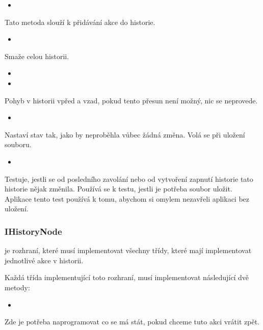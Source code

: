 \documentclass[
  field=inf,
  biblatex=false,
  glossaries,
  index
]{kidiplom}
\begin{document}
\begin{itemize}
\item {}
\end{itemize}
Tato metoda slouží k přidávání akce do historie.

\begin{itemize}
\item {}
\end{itemize}
Smaže celou historii.

\begin{itemize}
\item {}
\item {}
\end{itemize}
Pohyb v historii vpřed a vzad, pokud tento přesun není možný, nic se neprovede.

\begin{itemize}
\item {}
\end{itemize}
Nastaví stav tak, jako by neproběhla vůbec žádná změna. Volá se při uložení souboru.

\begin{itemize}
\item {}
\end{itemize}
Testuje, jestli se od posledního zavolání  nebo od vytvoření zapnutí historie tato historie nějak změnila. Používá se k testu, jestli je potřeba soubor uložit. Aplikace tento test používá k tomu, abychom si omylem nezavřeli aplikaci bez uložení.

\subsubsection{IHistoryNode}
 je rozhraní, které musí implementovat všechny třídy, které mají implementovat jednotlivé akce v historii.

Každá třída implementující toto rozhraní, musí implementovat následující dvě metody:

\begin{itemize}
\item {}
\end{itemize}
Zde je potřeba naprogramovat co se má stát, pokud chceme tuto akci vrátit zpět.
\end{document}
